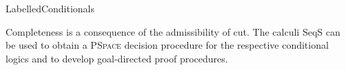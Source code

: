 \begin{entry}{LabelledConditionals}
 \begin{technicalities}
Completeness is a consequence of the admissibility of cut. The calculi SeqS can be used to obtain a \textsc{PSpace} decision procedure for the respective conditional logics and to develop goal-directed proof procedures.
 \end{technicalities}



%
%
%
%
%
%
% 
%












\end{entry}
